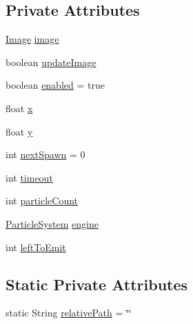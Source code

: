 \subsection*{Private Attributes}
\begin{DoxyCompactItemize}
\item 
\mbox{\hyperlink{classorg_1_1newdawn_1_1slick_1_1_image}{Image}} \mbox{\hyperlink{classorg_1_1newdawn_1_1slick_1_1particles_1_1_configurable_emitter_a88bff6e9d28f85572e862e9bd8eb6712}{image}}
\item 
boolean \mbox{\hyperlink{classorg_1_1newdawn_1_1slick_1_1particles_1_1_configurable_emitter_af2f4ae84fa172913e084d65fa18432b6}{update\+Image}}
\item 
boolean \mbox{\hyperlink{classorg_1_1newdawn_1_1slick_1_1particles_1_1_configurable_emitter_a946084290596958350688f1e02b6e611}{enabled}} = true
\item 
float \mbox{\hyperlink{classorg_1_1newdawn_1_1slick_1_1particles_1_1_configurable_emitter_a4198d77b5f4ee2b55be6e4732744b9cb}{x}}
\item 
float \mbox{\hyperlink{classorg_1_1newdawn_1_1slick_1_1particles_1_1_configurable_emitter_af1da7225bf1c489ad9a5323bf2a20ade}{y}}
\item 
int \mbox{\hyperlink{classorg_1_1newdawn_1_1slick_1_1particles_1_1_configurable_emitter_a29294edce5adae3a522d3486a6805030}{next\+Spawn}} = 0
\item 
int \mbox{\hyperlink{classorg_1_1newdawn_1_1slick_1_1particles_1_1_configurable_emitter_ac35e9ad9b1c5a0fc37e533fd32153fc4}{timeout}}
\item 
int \mbox{\hyperlink{classorg_1_1newdawn_1_1slick_1_1particles_1_1_configurable_emitter_a58b2c979b10877d5ace8133d3950fe9e}{particle\+Count}}
\item 
\mbox{\hyperlink{classorg_1_1newdawn_1_1slick_1_1particles_1_1_particle_system}{Particle\+System}} \mbox{\hyperlink{classorg_1_1newdawn_1_1slick_1_1particles_1_1_configurable_emitter_ad35b105949c7f6c67f4dba02287b3a09}{engine}}
\item 
int \mbox{\hyperlink{classorg_1_1newdawn_1_1slick_1_1particles_1_1_configurable_emitter_a3bbb120034b27280fb242f61f3f8e039}{left\+To\+Emit}}
\end{DoxyCompactItemize}
\subsection*{Static Private Attributes}
\begin{DoxyCompactItemize}
\item 
static String \mbox{\hyperlink{classorg_1_1newdawn_1_1slick_1_1particles_1_1_configurable_emitter_a33ddbea65330cfe81c2a92742b1bc999}{relative\+Path}} = \char`\"{}\char`\"{}
\end{DoxyCompactItemize}


